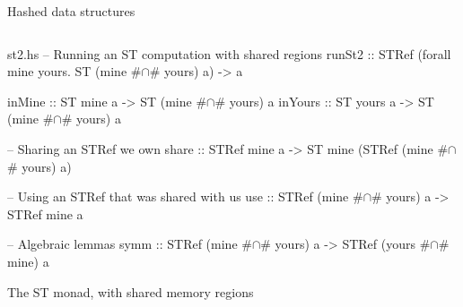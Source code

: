 \documentclass{beamer}
\begin{document}
\begin{frame}{Hashed data structures}
\inputminted{haskell}{hashes.hs}
\end{frame}

\begin{filecontents*}{st2.hs}
-- Running an ST computation with shared regions
runSt2  ::
  STRef (forall mine yours. ST (mine #$\cap$# yours) a) -> a

inMine  :: ST mine  a -> ST (mine #$\cap$# yours) a
inYours :: ST yours a -> ST (mine #$\cap$# yours) a

-- Sharing an STRef we own
share  :: STRef mine a -> ST mine (STRef (mine #$\cap$# yours) a)

-- Using an STRef that was shared with us
use    :: STRef (mine #$\cap$# yours) a -> STRef mine a

-- Algebraic lemmas
symm   :: STRef (mine #$\cap$# yours) a -> STRef (yours #$\cap$# mine) a

\end{filecontents*}

\begin{frame}{}\end{frame}

\usebackgroundtemplate{}
\begin{frame}{The ST monad, with shared memory regions}
  \inputminted{haskell}{st2.hs}
\end{frame}
\end{document}
